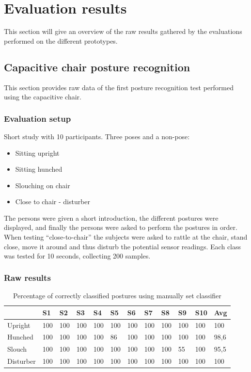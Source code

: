 \chapter{Evaluation results}
This section will give an overview of the raw results gathered by the evaluations performed on the different prototypes.
\section{Capacitive chair posture recognition}
\label{ch:app_capchair_eval}
This section provides raw data of the first posture recognition test performed using the capacitive chair. 
\subsection{Evaluation setup}
Short study with 10 participants. Three poses and a non-pose:
\begin{itemize}
\item Sitting upright
\item Sitting hunched
\item Slouching on chair
\item Close to chair - disturber
\end{itemize}

The persons were given a short introduction, the different postures were displayed, and finally the persons were asked to perform the postures in order. When testing “close-to-chair” the subjects were asked to rattle at the chair, stand close, move it around and thus disturb the potential sensor readings. Each class was tested for 10 seconds, collecting 200 samples. 

\subsection{Raw results}
\begin{table}[htbp]
  \centering
  \caption{Percentage of correctly classified postures using manually set classifier}
    \begin{tabularx}{\linewidth}{XXXXXXXXXXXX}
    \toprule
          & S1    & S2    & S3    & S4    & S5    & S6    & S7    & S8    & S9    & S10   & Avg \\
    \midrule
    Upright & 100   & 100   & 100   & 100   & 100   & 100   & 100   & 100   & 100   & 100   & 100 \\
    Hunched & 100   & 100   & 100   & 100   & 86    & 100   & 100   & 100   & 100   & 100   & 98,6 \\
    Slouch & 100   & 100   & 100   & 100   & 100   & 100   & 100   & 100   & 55    & 100   & 95,5 \\
    Disturber & 100   & 100   & 100   & 100   & 100   & 100   & 100   & 100   & 100   & 100   & 100 \\
    \bottomrule
    \end{tabularx}%
  \label{tab:app_eval_chair_raw1}%
\end{table}%
